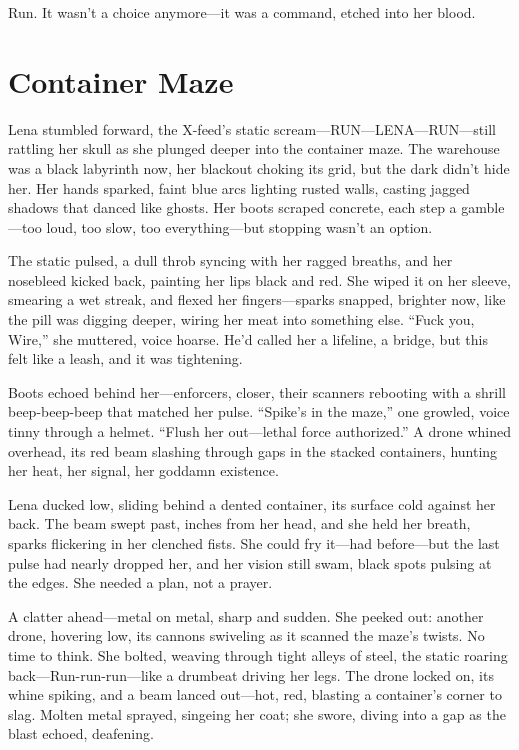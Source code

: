 \documentclass[12pt]{book}
\begin{document}
Run. It wasn’t a choice anymore---it was a command, etched into her blood.

\section{Container Maze}

Lena stumbled forward, the X-feed’s static scream---RUN---LENA---RUN---still rattling her skull as she plunged deeper into the container maze. The warehouse was a black labyrinth now, her blackout choking its grid, but the dark didn’t hide her. Her hands sparked, faint blue arcs lighting rusted walls, casting jagged shadows that danced like ghosts. Her boots scraped concrete, each step a gamble---too loud, too slow, too everything---but stopping wasn’t an option.

The static pulsed, a dull throb syncing with her ragged breaths, and her nosebleed kicked back, painting her lips black and red. She wiped it on her sleeve, smearing a wet streak, and flexed her fingers---sparks snapped, brighter now, like the pill was digging deeper, wiring her meat into something else. ``Fuck you, Wire,'' she muttered, voice hoarse. He’d called her a lifeline, a bridge, but this felt like a leash, and it was tightening.

Boots echoed behind her---enforcers, closer, their scanners rebooting with a shrill beep-beep-beep that matched her pulse. ``Spike’s in the maze,'' one growled, voice tinny through a helmet. ``Flush her out---lethal force authorized.'' A drone whined overhead, its red beam slashing through gaps in the stacked containers, hunting her heat, her signal, her goddamn existence.

Lena ducked low, sliding behind a dented container, its surface cold against her back. The beam swept past, inches from her head, and she held her breath, sparks flickering in her clenched fists. She could fry it---had before---but the last pulse had nearly dropped her, and her vision still swam, black spots pulsing at the edges. She needed a plan, not a prayer.

A clatter ahead---metal on metal, sharp and sudden. She peeked out: another drone, hovering low, its cannons swiveling as it scanned the maze’s twists. No time to think. She bolted, weaving through tight alleys of steel, the static roaring back---Run-run-run---like a drumbeat driving her legs. The drone locked on, its whine spiking, and a beam lanced out---hot, red, blasting a container’s corner to slag. Molten metal sprayed, singeing her coat; she swore, diving into a gap as the blast echoed, deafening.
\end{document}
